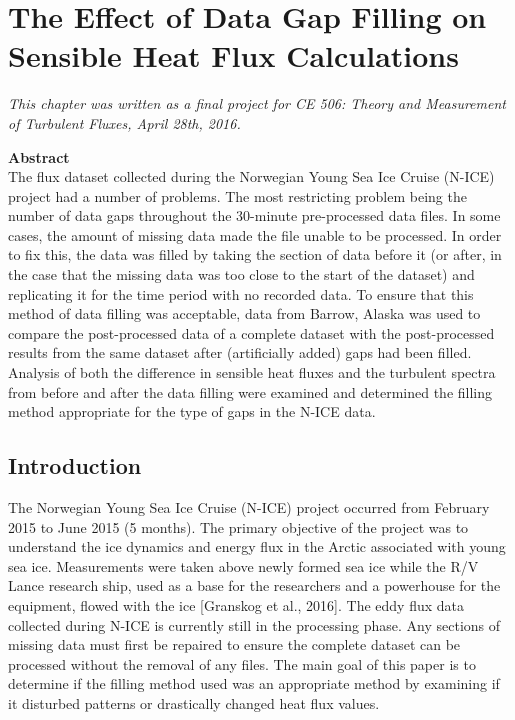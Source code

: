 \chapter{The Effect of Data Gap Filling on Sensible Heat Flux Calculations}
\bigskip
\begin{spacing}{1}
\begin{center}
\textit{This chapter was written as a final project for CE 506: Theory and Measurement of Turbulent Fluxes, April 28th, 2016.}\\
\end{center}
\bigskip
\noindent \textbf{Abstract}\\
\noindent The flux dataset collected during the Norwegian Young Sea Ice Cruise (N-ICE) project had a number of problems. The most restricting problem being the number of data gaps throughout the 30-minute pre-processed data files. In some cases, the amount of missing data made the file unable to be processed. In order to fix this, the data was filled by taking the section of data before it (or after, in the case that the missing data was too close to the start of the dataset) and replicating it for the time period with no recorded data. To ensure that this method of data filling was acceptable, data from Barrow, Alaska was used to compare the post-processed data of a complete dataset with the post-processed results from the same dataset after (artificially added) gaps had been filled. Analysis of both the difference in sensible heat fluxes and the turbulent spectra from before and after the data filling were examined and determined the filling method appropriate for the type of gaps in the N-ICE data. 
\end{spacing}
\doublespacing

\section{Introduction}
The Norwegian Young Sea Ice Cruise (N-ICE) project occurred from February 2015 to June 2015 (5 months). The primary objective of the project was to understand the ice dynamics and energy flux in the Arctic associated with young sea ice. Measurements were taken above newly formed sea ice while the R/V Lance research ship, used as a base for the researchers and a powerhouse for the equipment, flowed with the ice [Granskog et al., 2016]. The eddy flux data collected during N-ICE is currently still in the processing phase. Any sections of missing data must first be repaired to ensure the complete dataset can be processed without the removal of any files. The main goal of this paper is to determine if the filling method used was an appropriate method by examining if it disturbed patterns or drastically changed heat flux values.

